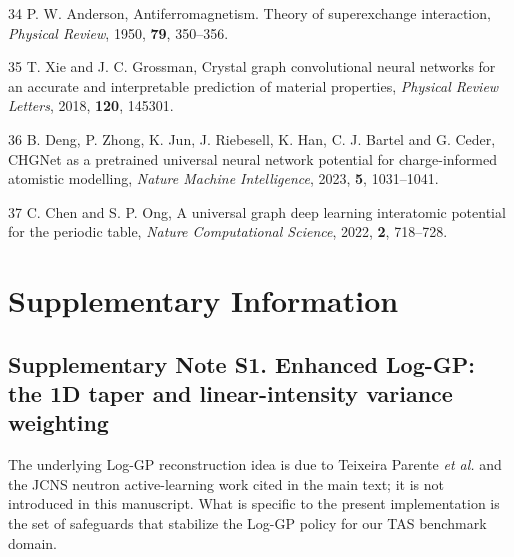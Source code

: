 \documentclass[
]{article}
\newenvironment{cslreferences}%
  {}%
  {\par}
\begin{document}
\begin{cslreferences}
\leavevmode\hypertarget{ref-anderson1950}{}%
34 P. W. Anderson, Antiferromagnetism. Theory of superexchange
interaction, \emph{Physical Review}, 1950, \textbf{79}, 350--356.

\leavevmode\hypertarget{ref-xie2018cgcnn}{}%
35 T. Xie and J. C. Grossman, Crystal graph convolutional neural
networks for an accurate and interpretable prediction of material
properties, \emph{Physical Review Letters}, 2018, \textbf{120}, 145301.

\leavevmode\hypertarget{ref-deng2023chgnet}{}%
36 B. Deng, P. Zhong, K. Jun, J. Riebesell, K. Han, C. J. Bartel and G.
Ceder, CHGNet as a pretrained universal neural network potential for
charge-informed atomistic modelling, \emph{Nature Machine Intelligence},
2023, \textbf{5}, 1031--1041.

\leavevmode\hypertarget{ref-chen2022m3gnet}{}%
37 C. Chen and S. P. Ong, A universal graph deep learning interatomic
potential for the periodic table, \emph{Nature Computational Science},
2022, \textbf{2}, 718--728.
\end{cslreferences}

\clearpage
\appendix
\setcounter{secnumdepth}{3}
\renewcommand{\thesubsection}{S\arabic{subsection}}
\renewcommand{\thesubsubsection}{S\arabic{subsection}.\arabic{subsubsection}}
\renewcommand{\thefigure}{S\arabic{figure}}
\renewcommand{\thetable}{S\arabic{table}}
\renewcommand{\theequation}{S\arabic{equation}}
\setcounter{figure}{0}
\setcounter{table}{0}
\setcounter{equation}{0}
\setcounter{subsection}{0}
\setcounter{subsubsection}{0}
\section*{Supplementary Information}

\hypertarget{supplementary-note-s1.-enhanced-log-gp-the-1d-taper-and-linear-intensity-variance-weighting}{%
\subsection{Supplementary Note S1. Enhanced Log-GP: the 1D taper and
linear-intensity variance
weighting}\label{supplementary-note-s1.-enhanced-log-gp-the-1d-taper-and-linear-intensity-variance-weighting}}

The underlying Log-GP reconstruction idea is due to Teixeira Parente
\emph{et al.} and the JCNS neutron active-learning work cited in the
main text; it is not introduced in this manuscript. What is specific to
the present implementation is the set of safeguards that stabilize the
Log-GP policy for our TAS benchmark domain.
\end{document}
